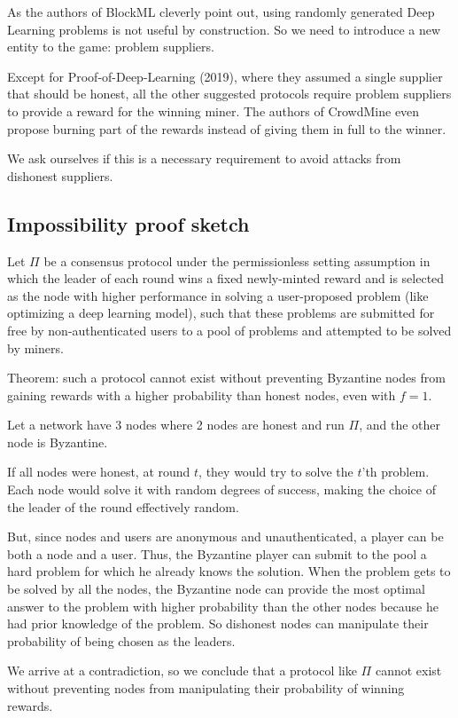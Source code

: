 \documentclass[conference]{IEEEtran}
\begin{document}
As the authors of BlockML cleverly point out, using randomly generated Deep Learning problems is not useful by construction. So we need to introduce a new entity to the game: problem suppliers.

Except for Proof-of-Deep-Learning (2019), where they assumed a single supplier that should be honest, all the other suggested protocols require problem suppliers to provide a reward for the winning miner. The authors of CrowdMine even propose burning part of the rewards instead of giving them in full to the winner.

We ask ourselves if this is a necessary requirement to avoid attacks from dishonest suppliers.

\subsection{Impossibility proof sketch}

Let $\Pi$ be a consensus protocol under the permissionless setting assumption in which the leader of each round wins a fixed newly-minted reward and is selected as the node with higher performance in solving a user-proposed problem (like optimizing a deep learning model), such that these problems are submitted for free by non-authenticated users to a pool of problems and attempted to be solved by miners.

Theorem: such a protocol cannot exist without preventing Byzantine nodes from gaining rewards with a higher probability than honest nodes, even with $f=1$.

Let a network have 3 nodes where 2 nodes are honest and run $\Pi$, and the other node is Byzantine.

If all nodes were honest, at round $t$, they would try to solve the $t$'th problem. Each node would solve it with random degrees of success, making the choice of the leader of the round effectively random.

But, since nodes and users are anonymous and unauthenticated, a player can be both a node and a user. Thus, the Byzantine player can submit to the pool a hard problem for which he already knows the solution. When the problem gets to be solved by all the nodes, the Byzantine node can provide the most optimal answer to the problem with higher probability than the other nodes because he had prior knowledge of the problem. So dishonest nodes can manipulate their probability of being chosen as the leaders.

We arrive at a contradiction, so we conclude that a protocol like $\Pi$ cannot exist without preventing nodes from manipulating their probability of winning rewards. 
\end{document}
